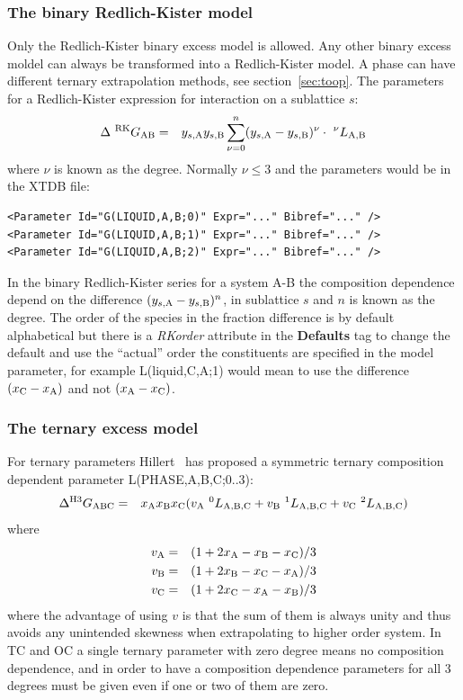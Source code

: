 \documentclass{article}
\begin{document}
\begin{appendices}
\subsubsection{The binary Redlich-Kister model}\label{sec:RK}

Only the Redlich-Kister binary excess model is allowed.  Any other
binary excess moldel can always be transformed into a Redlich-Kister
model.  A phase can have different ternary extrapolation methods, see
section~\ref{sec:toop}.  The parameters for a Redlich-Kister expression
for interaction on a sublattice $s$:
\begin{eqnarray}
\Delta ~^{\rm RK}G_{\rm AB} &=& y_{s,\rm A}y_{s,\rm B} \sum_{\nu=0}^n (y_{s,\rm A}-y_{s,\rm B})^{\nu} \cdot ~^{\nu}L_{\rm A,B}
\end{eqnarray}
where $\nu$ is known as the degree.  Normally $\nu \le 3$ 
and the parameters would be in the XTDB file:

\begin{verbatim}
<Parameter Id="G(LIQUID,A,B;0)" Expr="..." Bibref="..." />
<Parameter Id="G(LIQUID,A,B;1)" Expr="..." Bibref="..." />
<Parameter Id="G(LIQUID,A,B;2)" Expr="..." Bibref="..." />
\end{verbatim}

In the binary Redlich-Kister series for a system A-B the composition
dependence depend on the difference $(y_{s,\rm A}-y_{s,\rm B})^n$, in
sublattice $s$ and $n$ is known as the degree.  The order of the
species in the fraction difference is by default alphabetical but
there is a {\em RKorder} attribute in the {\bf Defaults} tag to change
the default and use the ``actual'' order the constituents are
specified in the model parameter, for example L(liquid,C,A;1) would
mean to use the difference $(x_{\rm C}-x_{\rm A})$ and not $(x_{\rm
  A}-x_{\rm C})$.

\subsubsection{The ternary excess model}\label{sec:hillert3}

For ternary parameters Hillert~\cite{80Hil} has proposed a symmetric
ternary composition dependent parameter L(PHASE,A,B,C;0..3):
\begin{eqnarray}
\Delta ^{\rm H3}G_{\rm ABC} &=& x_{\rm A}x_{\rm B}x_{\rm C}(v_{\rm A}~^0L_{\rm A,B,C}+v_{\rm B}~^1L_{\rm A,B,C}+v_{\rm C}~^2L_{\rm A,B,C}) \label{eq:hillert3}
\end{eqnarray}
where
\begin{eqnarray}
v_{\rm A} &=& (1+2x_{\rm A}-x_{\rm B}-x_{\rm C})/3\\
v_{\rm B} &=& (1+2x_{\rm B}-x_{\rm C}-x_{\rm A})/3\\
v_{\rm C} &=& (1+2x_{\rm C}-x_{\rm A}-x_{\rm B})/3
\end{eqnarray}
where the advantage of using $v$ is that the sum of them is always
unity and thus avoids any unintended skewness when extrapolating to
higher order system.  In TC and OC a single ternary parameter with
zero degree means no composition dependence, and in order to have a
composition dependence parameters for all 3 degrees must be given even
if one or two of them are zero.


\end{appendices}
\end{document}
